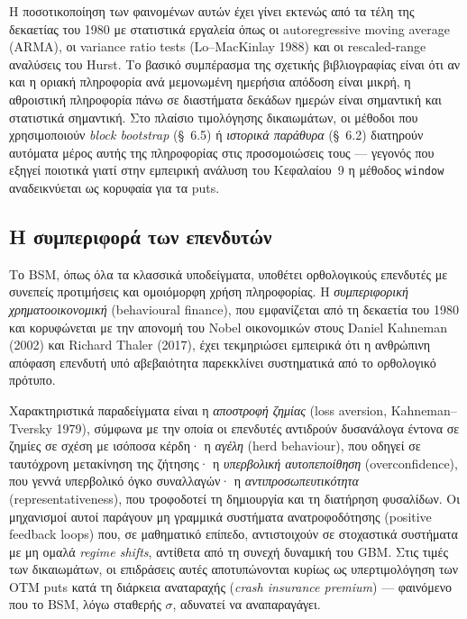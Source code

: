 \documentclass[12pt]{article}
\begin{document}
Η ποσοτικοποίηση των φαινομένων αυτών έχει γίνει εκτενώς από τα τέλη της δεκαετίας του 1980 με στατιστικά εργαλεία όπως οι autoregressive moving average (ARMA), οι variance ratio tests (Lo–MacKinlay 1988) και οι rescaled-range αναλύσεις του Hurst. Το βασικό συμπέρασμα της σχετικής βιβλιογραφίας είναι ότι αν και η οριακή πληροφορία ανά μεμονωμένη ημερήσια απόδοση είναι μικρή, η αθροιστική πληροφορία πάνω σε διαστήματα δεκάδων ημερών είναι σημαντική και στατιστικά σημαντική. Στο πλαίσιο τιμολόγησης δικαιωμάτων, οι μέθοδοι που χρησιμοποιούν \emph{block bootstrap} (\S~6.5) ή \emph{ιστορικά παράθυρα} (\S~6.2) διατηρούν αυτόματα μέρος αυτής της πληροφορίας στις προσομοιώσεις τους — γεγονός που εξηγεί ποιοτικά γιατί στην εμπειρική ανάλυση του Κεφαλαίου~9 η μέθοδος \texttt{window} αναδεικνύεται ως κορυφαία για τα puts.

\subsection{Η συμπεριφορά των επενδυτών}

Το BSM, όπως όλα τα κλασσικά υποδείγματα, υποθέτει ορθολογικούς επενδυτές με συνεπείς προτιμήσεις και ομοιόμορφη χρήση πληροφορίας. Η \emph{συμπεριφορική χρηματοοικονομική} (behavioural finance), που εμφανίζεται από τη δεκαετία του 1980 και κορυφώνεται με την απονομή του Nobel οικονομικών στους Daniel Kahneman (2002) και Richard Thaler (2017), έχει τεκμηριώσει εμπειρικά ότι η ανθρώπινη απόφαση επενδυτή υπό αβεβαιότητα παρεκκλίνει συστηματικά από το ορθολογικό πρότυπο.

Χαρακτηριστικά παραδείγματα είναι η \emph{αποστροφή ζημίας} (loss aversion, Kahneman–Tversky 1979), σύμφωνα με την οποία οι επενδυτές αντιδρούν δυσανάλογα έντονα σε ζημίες σε σχέση με ισόποσα κέρδη· η \emph{αγέλη} (herd behaviour), που οδηγεί σε ταυτόχρονη μετακίνηση της ζήτησης· η \emph{υπερβολική αυτοπεποίθηση} (overconfidence), που γεννά υπερβολικό όγκο συναλλαγών· η \emph{αντιπροσωπευτικότητα} (representativeness), που τροφοδοτεί τη δημιουργία και τη διατήρηση φυσαλίδων. Οι μηχανισμοί αυτοί παράγουν μη γραμμικά συστήματα ανατροφοδότησης (positive feedback loops) που, σε μαθηματικό επίπεδο, αντιστοιχούν σε στοχαστικά συστήματα με μη ομαλά \emph{regime shifts}, αντίθετα από τη συνεχή δυναμική του GBM. Στις τιμές των δικαιωμάτων, οι επιδράσεις αυτές αποτυπώνονται κυρίως ως υπερτιμολόγηση των OTM puts κατά τη διάρκεια αναταραχής (\emph{crash insurance premium}) — φαινόμενο που το BSM, λόγω σταθερής $\sigma$, αδυνατεί να αναπαραγάγει.
\end{document}
